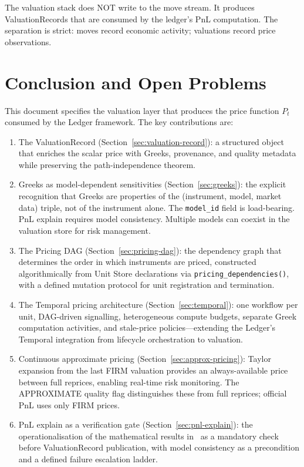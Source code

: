 \documentclass[11pt,a4paper]{article}
\begin{document}
\noindent The valuation stack does NOT write to the move stream.  It produces ValuationRecords that are consumed by the ledger's PnL computation.  The separation is strict: moves record economic activity; valuations record price observations.

\clearpage
\section{Conclusion and Open Problems}
\label{sec:conclusion}

This document specifies the valuation layer that produces the price function $P_t$ consumed by the Ledger framework.  The key contributions are:

\begin{enumerate}
\item The ValuationRecord (Section~\ref{sec:valuation-record}): a structured object that enriches the scalar price with Greeks, provenance, and quality metadata while preserving the path-independence theorem.

\item Greeks as model-dependent sensitivities (Section~\ref{sec:greeks}): the explicit recognition that Greeks are properties of the (instrument, model, market data) triple, not of the instrument alone.  The \texttt{model\_id} field is load-bearing.  PnL explain requires model consistency.  Multiple models can coexist in the valuation store for risk management.

\item The Pricing DAG (Section~\ref{sec:pricing-dag}): the dependency graph that determines the order in which instruments are priced, constructed algorithmically from Unit Store declarations via \texttt{pricing\_dependencies()}, with a defined mutation protocol for unit registration and termination.

\item The Temporal pricing architecture (Section~\ref{sec:temporal}): one workflow per unit, DAG-driven signalling, heterogeneous compute budgets, separate Greek computation activities, and stale-price policies---extending the Ledger's Temporal integration from lifecycle orchestration to valuation.

\item Continuous approximate pricing (Section~\ref{sec:approx-pricing}): Taylor expansion from the last FIRM valuation provides an always-available price between full reprices, enabling real-time risk monitoring.  The APPROXIMATE quality flag distinguishes these from full reprices; official PnL uses only FIRM prices.

\item PnL explain as a verification gate (Section~\ref{sec:pnl-explain}): the operationalisation of the mathematical results in~\cite{pnl_explain} as a mandatory check before ValuationRecord publication, with model consistency as a precondition and a defined failure escalation ladder.
\end{enumerate}
\end{document}

